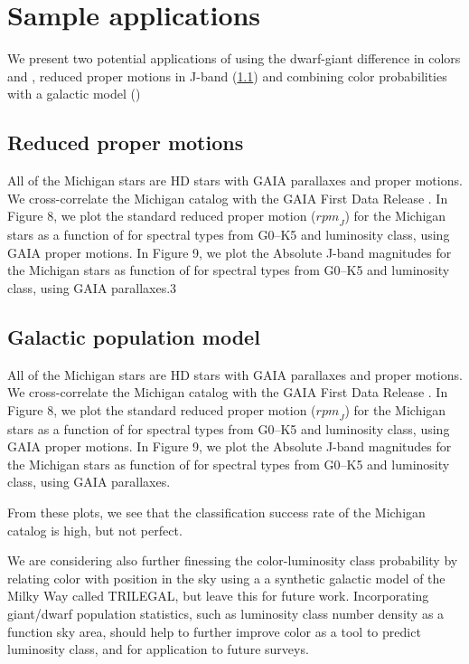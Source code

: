 \section{Sample applications}
We present two potential applications of using the dwarf-giant difference in colors \jwone and \jwtwo, reduced proper motions in J-band (\ref{subsec:RPM}) and combining color probabilities with a galactic model ()

\subsection{Reduced proper motions} \label{subsec:RPM}
All of the Michigan stars are HD stars with GAIA parallaxes and proper motions.  We cross-correlate the Michigan catalog with the GAIA First Data Release \citep[]{gaia1,gaia2,Lindegren2016}.  In Figure 8, we plot the standard reduced proper motion (${rpm}_J$) for the Michigan stars as a function of \jwtwo for spectral types from G0--K5 and luminosity class, using GAIA proper motions.  In Figure 9, we plot the Absolute J-band magnitudes for the Michigan stars as function of \jwtwo for spectral types from G0--K5 and luminosity class, using GAIA parallaxes.3
\subsection{Galactic population model} \label{subsec:galactic_model}
All of the Michigan stars are HD stars with GAIA parallaxes and proper motions.  We cross-correlate the Michigan catalog with the GAIA First Data Release \citep[]{gaia1,gaia2,Lindegren2016}.  In Figure 8, we plot the standard reduced proper motion (${rpm}_J$) for the Michigan stars as a function of \jwtwo for spectral types from G0--K5 and luminosity class, using GAIA proper motions.  In Figure 9, we plot the Absolute J-band magnitudes for the Michigan stars as function of \jwtwo for spectral types from G0--K5 and luminosity class, using GAIA parallaxes.

From these plots, we see that the classification success rate of the Michigan catalog is high, but not perfect.

We are considering also further finessing the color-luminosity class probability by relating color with position in the sky using a a synthetic galactic model of the Milky Way called TRILEGAL, but leave this for future work. Incorporating giant/dwarf population statistics, such as luminosity class number density as a function sky area, should help to further improve color as a tool to predict luminosity class, and for application to future surveys.


